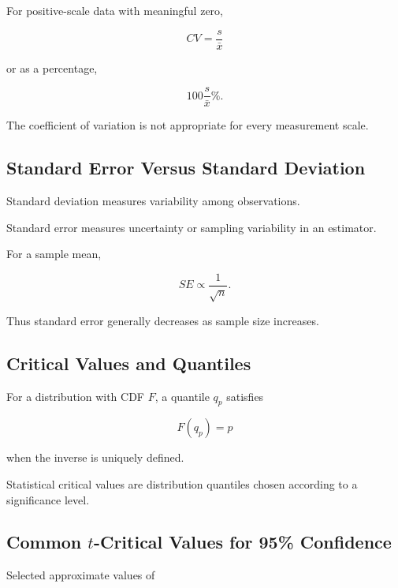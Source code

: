 For positive-scale data with meaningful zero,

\[
\boxed{
CV
=
\frac{
s
}{
\bar{x}
}
}
\]

or as a percentage,

\[
\boxed{
100
\frac{
s
}{
\bar{x}
}
\%.
}
\]

The coefficient of variation is not appropriate for every measurement scale.

\subsection{Standard Error Versus Standard Deviation}
\label{subsec:se-versus-sd}

Standard deviation measures variability among observations.

Standard error measures uncertainty or sampling variability in an estimator.

For a sample mean,

\[
\boxed{
SE
\propto
\frac1{\sqrt n}.
}
\]

Thus standard error generally decreases as sample size increases.

\subsection{Critical Values and Quantiles}
\label{subsec:critical-values-quantiles}

For a distribution with CDF \(F\), a quantile \(q_p\) satisfies

\[
\boxed{
F(q_p)=p
}
\]

when the inverse is uniquely defined.

Statistical critical values are distribution quantiles chosen according to a
significance level.

\subsection{Common \(t\)-Critical Values for 95\% Confidence}
\label{subsec:t-critical-selected-values}

Selected approximate values of

